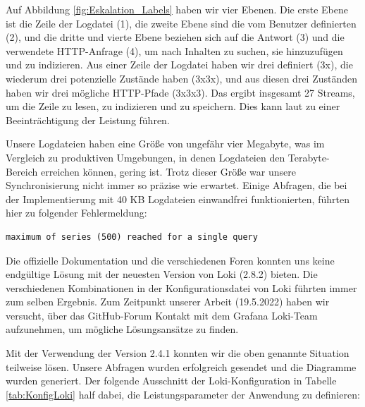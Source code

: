 Auf Abbildung \ref{fig:Eskalation_Labels} haben wir vier Ebenen. Die erste Ebene ist die Zeile der Logdatei (1), die zweite Ebene sind die vom Benutzer definierten  (2), und die dritte und vierte Ebene beziehen sich auf die Antwort (3) und die verwendete HTTP-Anfrage (4), um nach Inhalten zu suchen, sie hinzuzufügen und zu indizieren. Aus einer Zeile der Logdatei haben wir drei  definiert (3x), die wiederum drei potenzielle Zustände haben (3x3x), und aus diesen drei Zuständen haben wir drei mögliche HTTP-Pfade (3x3x3). Das ergibt insgesamt 27 Streams, um die Zeile zu lesen, zu indizieren und zu speichern. Dies kann laut \cite{Grafana_labels} zu einer Beeinträchtigung der Leistung führen.

Unsere Logdateien haben eine Größe von ungefähr vier Megabyte, was im Vergleich zu produktiven Umgebungen, in denen Logdateien den Terabyte-Bereich erreichen können, gering ist. Trotz dieser Größe war unsere Synchronisierung nicht immer so präzise wie erwartet. Einige Abfragen, die bei der Implementierung mit 40 KB Logdateien einwandfrei funktionierten, führten hier zu folgender Fehlermeldung:

{
\begin{Verbatim}[fontsize=\small, frame=single]
maximum of series (500) reached for a single query  
\end{Verbatim}
}

Die offizielle Dokumentation und die verschiedenen Foren konnten uns keine endgültige Lösung mit der neuesten Version von Loki (2.8.2) bieten. Die verschiedenen Kombinationen in der Konfigurationsdatei von Loki führten immer zum selben Ergebnis. Zum Zeitpunkt unserer Arbeit (19.5.2022) haben wir versucht, über das GitHub-Forum Kontakt mit dem Grafana Loki-Team aufzunehmen, um mögliche Lösungsansätze zu finden.

Mit der Verwendung der Version 2.4.1 konnten wir die oben genannte Situation teilweise lösen. Unsere Abfragen wurden erfolgreich gesendet und die Diagramme wurden generiert. Der folgende Ausschnitt der Loki-Konfiguration in Tabelle \ref{tab:KonfigLoki} half dabei, die Leistungsparameter der Anwendung zu definieren:


